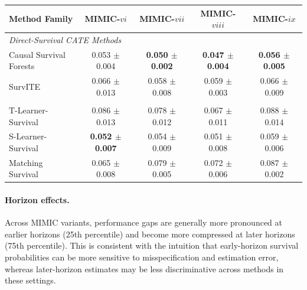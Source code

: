\documentclass{article} %
\begin{document}
\begin{table}[!ht]
        \begin{subtable}{\linewidth}
        \centering
        \begin{tabular}{lcccc}
        \toprule
        \textbf{Method Family} & \textbf{MIMIC-$vi$} & \textbf{MIMIC-$vii$} & \textbf{MIMIC-$viii$} & \textbf{MIMIC-$ix$} \\
        \midrule
        \multicolumn{5}{l}{\textit{Direct-Survival CATE Methods}} \\
                Causal Survival Forests & 0.053 $\pm$ 0.004 & \textbf{0.050 $\pm$ 0.002} & \textbf{0.047 $\pm$ 0.004} & \textbf{0.056 $\pm$ 0.005} \\ 
                SurvITE & 0.066 $\pm$ 0.013 & 0.058 $\pm$ 0.008 & 0.059 $\pm$ 0.003 & 0.066 $\pm$ 0.009 \\ 
        \addlinespace
        \multicolumn{5}{l}{\textit{Survival Meta-Learners}} \\
                T-Learner-Survival & 0.086 $\pm$ 0.013 & 0.078 $\pm$ 0.012 & 0.067 $\pm$ 0.011 & 0.088 $\pm$ 0.014 \\ 
                S-Learner-Survival & \textbf{0.052 $\pm$ 0.007} & 0.054 $\pm$ 0.009 & 0.051 $\pm$ 0.008 & 0.059 $\pm$ 0.006 \\ 
                Matching Survival & 0.065 $\pm$ 0.008 & 0.079 $\pm$ 0.005 & 0.072 $\pm$ 0.006 & 0.087 $\pm$ 0.002 \\ 
        \bottomrule
        \end{tabular}
        \end{subtable}
\end{table}


\paragraph{Horizon effects.}
Across MIMIC variants, performance gaps are generally more pronounced at earlier horizons (25th percentile) and become more compressed at later horizons (75th percentile). This is consistent with the intuition that early-horizon survival probabilities can be more sensitive to misspecification and estimation error, whereas later-horizon estimates may be less discriminative across methods in these settings.
\end{document}
